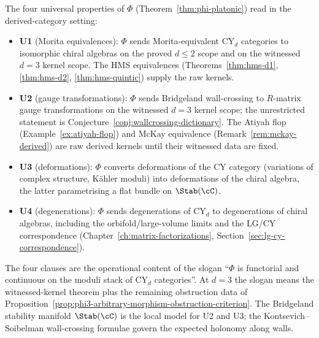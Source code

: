 \begin{remark}
\label{rem:phi-functoriality-summary}
The four universal properties of $\Phi$ (Theorem~\ref{thm:phi-platonic}) read in the derived-category setting:
\begin{itemize}
 \item \textbf{U1} (Morita equivalences): $\Phi$ sends Morita-equivalent CY$_d$ categories to isomorphic chiral algebras on the proved $d\leq2$ scope and on the witnessed $d=3$ kernel scope. The HMS equivalences (Theorems~\ref{thm:hms-d1}, \ref{thm:hms-d2}, \ref{thm:hms-quintic}) supply the raw kernels.
 \item \textbf{U2} (gauge transformations): $\Phi$ sends Bridgeland wall-crossing to $R$-matrix gauge transformations on the witnessed $d=3$ kernel scope; the unrestricted statement is Conjecture~\ref{conj:wallcrossing-dictionary}. The Atiyah flop (Example~\ref{ex:atiyah-flop}) and McKay equivalence (Remark~\ref{rem:mckay-derived}) are raw derived kernels until their witnessed data are fixed.
 \item \textbf{U3} (deformations): $\Phi$ converts deformations of the CY category (variations of complex structure, K\"ahler moduli) into deformations of the chiral algebra, the latter parametrising a flat bundle on $\Stab(\cC)$.
 \item \textbf{U4} (degenerations): $\Phi$ sends degenerations of CY$_d$ to degenerations of chiral algebras, including the orbifold/large-volume limits and the LG/CY correspondence (Chapter~\ref{ch:matrix-factorizations}, Section~\ref{sec:lg-cy-correspondence}).
\end{itemize}
The four clauses are the operational content of the slogan ``$\Phi$ is functorial and continuous on the moduli stack of CY$_d$ categories''. At $d = 3$ the slogan means the witnessed-kernel theorem plus the remaining obstruction data of Proposition~\ref{prop:phi3-arbitrary-morphism-obstruction-criterion}. The Bridgeland stability manifold $\Stab(\cC)$ is the local model for U2 and U3; the Kontsevich--Soibelman wall-crossing formulae govern the expected holonomy along walls.
\end{remark}

